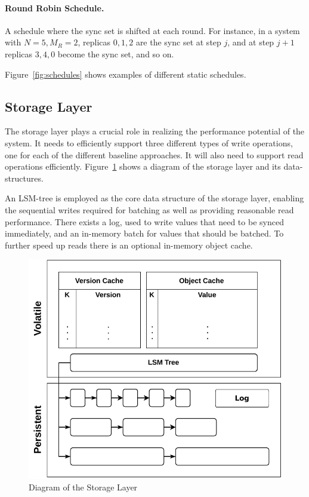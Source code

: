 \paragraph{Round Robin Schedule.} A schedule where the sync set
is shifted at each round. For instance, in a system with $N = 5,
M_R = 2$, replicas $0, 1, 2$ are the sync set at step $j$, and
at step $j + 1$ replicas $3, 4, 0$ become the sync set, and so
on.

Figure~\ref{fig:schedules} shows examples of different static
schedules.

\subsection{Storage Layer}\label{ssec:storage}

The storage layer plays a crucial role in realizing the
performance potential of the system. It needs to efficiently support
three different types of write operations, one for each of the
different baseline approaches. It will also need to support read operations
efficiently. Figure~\ref{fig:storage_layer} shows a diagram of
the storage layer and its data-structures.

An \ac{LSM-tree} is employed as the core data structure of the storage
layer, enabling the sequential writes required for batching as
well as providing reasonable read performance. There exists a
log, used to write values that need to be synced immediately, and
an in-memory batch for values that should be batched. To further speed
up reads there is an optional in-memory object cache.

\begin{figure}[t]
    \centering
    \includegraphics[width=.75\linewidth]{img/storage_layer}
    \caption{Diagram of the Storage Layer}\label{fig:storage_layer}
\end{figure}



